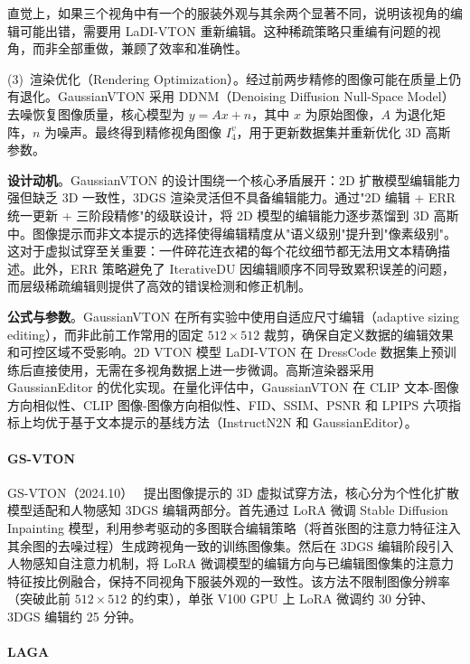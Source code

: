 直觉上，如果三个视角中有一个的服装外观与其余两个显著不同，说明该视角的编辑可能出错，需要用 LaDI-VTON 重新编辑。这种稀疏策略只重编有问题的视角，而非全部重做，兼顾了效率和准确性。

(3)~渲染优化（Rendering Optimization）。经过前两步精修的图像可能在质量上仍有退化。GaussianVTON 采用 DDNM（Denoising Diffusion Null-Space Model）去噪恢复图像质量，核心模型为 $y = Ax + n$，其中 $x$ 为原始图像，$A$ 为退化矩阵，$n$ 为噪声。最终得到精修视角图像 $I_4^v$，用于更新数据集并重新优化 3D 高斯参数。

\textbf{设计动机}。GaussianVTON 的设计围绕一个核心矛盾展开：2D 扩散模型编辑能力强但缺乏 3D 一致性，3DGS 渲染灵活但不具备编辑能力。通过"2D 编辑 + ERR 统一更新 + 三阶段精修"的级联设计，将 2D 模型的编辑能力逐步蒸馏到 3D 高斯中。图像提示而非文本提示的选择使得编辑精度从"语义级别"提升到"像素级别"。这对于虚拟试穿至关重要：一件碎花连衣裙的每个花纹细节都无法用文本精确描述。此外，ERR 策略避免了 IterativeDU 因编辑顺序不同导致累积误差的问题，而层级稀疏编辑则提供了高效的错误检测和修正机制。

\textbf{公式与参数}。GaussianVTON 在所有实验中使用自适应尺寸编辑（adaptive sizing editing），而非此前工作常用的固定 $512 \times 512$ 裁剪，确保自定义数据的编辑效果和可控区域不受影响。2D VTON 模型 LaDI-VTON 在 DressCode 数据集上预训练后直接使用，无需在多视角数据上进一步微调。高斯渲染器采用 GaussianEditor 的优化实现。在量化评估中，GaussianVTON 在 CLIP 文本-图像方向相似性、CLIP 图像-图像方向相似性、FID、SSIM、PSNR 和 LPIPS 六项指标上均优于基于文本提示的基线方法（InstructN2N 和 GaussianEditor）。

\paragraph{GS-VTON}

GS-VTON（2024.10）~\cite{2410_05259} 提出图像提示的 3D 虚拟试穿方法，核心分为个性化扩散模型适配和人物感知 3DGS 编辑两部分。首先通过 LoRA 微调 Stable Diffusion Inpainting 模型，利用参考驱动的多图联合编辑策略（将首张图的注意力特征注入其余图的去噪过程）生成跨视角一致的训练图像集。然后在 3DGS 编辑阶段引入人物感知自注意力机制，将 LoRA 微调模型的编辑方向与已编辑图像集的注意力特征按比例融合，保持不同视角下服装外观的一致性。该方法不限制图像分辨率（突破此前 $512 \times 512$ 的约束），单张 V100 GPU 上 LoRA 微调约 30 分钟、3DGS 编辑约 25 分钟。

\paragraph{LAGA}

